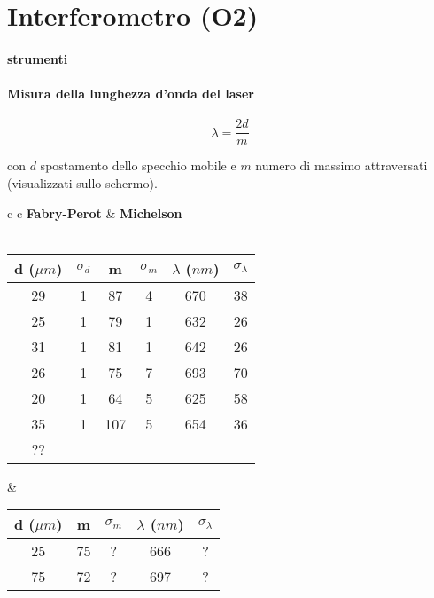 \documentclass[a4paper,10pt]{report}
\begin{document}
\chapter{Interferometro (O2)}

\subsubsection{ strumenti}


\subsubsection{Misura della lunghezza d'onda del laser}

$$ \lambda = \frac{2d}{m} $$

con $d$ spostamento dello specchio mobile e $m$ numero di massimo attraversati (visualizzati sullo schermo).

\begin{center}

\begin{tabular}{c c}
\textbf{Fabry-Perot} & \hspace{2cm} \textbf{Michelson}\\
\\
\begin{tabular}{c|c|c|c|c|c}
d ($\mu m$)& $\sigma_d$ & m & $\sigma_m$ & $\lambda$ ($nm$) & $\sigma_{\lambda}$\\
\midrule
29 & 1 & 87 & 4 & 670 & 38\\
25 & 1 & 79 & 1 & 632 & 26\\
31 & 1 & 81 & 1 & 642 & 26\\
26 & 1 & 75 & 7 & 693 & 70\\
20 & 1 & 64 & 5 & 625 & 58\\
35 & 1 & 107 & 5 & 654 & 36\\


?? \\

\end{tabular}

& \hspace{2cm}

\begin{tabular}{c|c|c|c|c}
d ($\mu m$)& m & $\sigma_m$ & $\lambda$ ($nm$) & $\sigma_{\lambda}$\\
\midrule
25 & 75 & ? & 666 & ?\\
75 & 72 & ? & 697 & ?\\

\end{tabular}

\end{tabular}

\end{center} 
\end{document}
